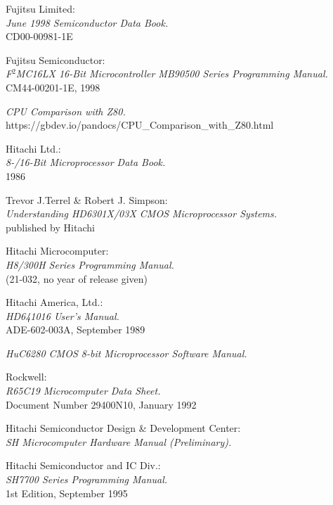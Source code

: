  Fujitsu Limited: \\
                    {\em June 1998 Semiconductor Data Book.\/} \\
                    CD00-00981-1E

 Fujitsu Semiconductor: \\
                    {\em F$^2$MC16LX 16-Bit Microcontroller MB90500 Series
                         Programming Manual.\/} \\
                    CM44-00201-1E, 1998

 {\em CPU Comparison with Z80.\/} \\
                https://gbdev.io/pandocs/CPU\_Comparison\_with\_Z80.html

 Hitachi Ltd.: \\
                 {\em 8-/16-Bit Microprocessor Data Book.\/} \\
                 1986

 Trevor J.Terrel \& Robert J. Simpson: \\
                {\em Understanding HD6301X/03X CMOS Microprocessor
                 Systems.\/} \\
		published by Hitachi

 Hitachi Microcomputer: \\
                {\em H8/300H Series Programming Manual.\/} \\
                (21-032, no year of release given)

 Hitachi America, Ltd.: \\
                {\em HD641016 User's Manual.\/} \\
                ADE-602-003A, September 1989

 {\em HuC6280 CMOS 8-bit Microprocessor Software Manual.\/}

 Rockwell: \\
                {\em R65C19 Microcomputer Data Sheet.\/} \\
                Document Number 29400N10, January 1992

 Hitachi Semiconductor Design \& Development Center: \\
                 {\em SH Microcomputer Hardware Manual
                 (Preliminary).\/}

 Hitachi Semiconductor and IC Div.: \\
                 {\em SH7700 Series Programming Manual.\/} \\
                 1st Edition, September 1995

